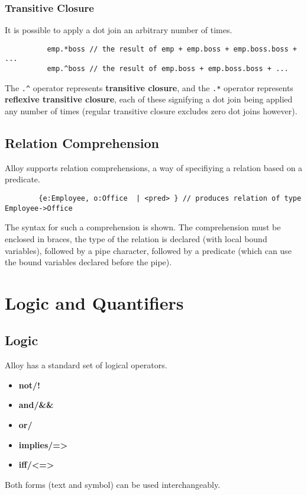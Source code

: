 \documentclass[10pt]{article}
\begin{document}
      \subsubsection*{Transitive Closure}
        It is possible to apply a dot join an arbitrary number of times.
        \begin{lstlisting}
          emp.*boss // the result of emp + emp.boss + emp.boss.boss + ...
          emp.^boss // the result of emp.boss + emp.boss.boss + ...
        \end{lstlisting}\par
        The \lstinline|.^| operator represents \textbf{transitive closure}, and the \lstinline|.*| operator represents \textbf{reflexive transitive closure}, each of these signifying a dot join being applied any number of times (regular transitive closure excludes zero dot joins however).
    \subsection*{Relation Comprehension}
      Alloy supports relation comprehensions, a way of specifiying a relation based on a predicate.
      \begin{lstlisting}
        {e:Employee, o:Office  | <pred> } // produces relation of type Employee->Office
      \end{lstlisting}\par
      The syntax for such a comprehension is shown. The comprehension must be enclosed in braces, the type of the relation is declared (with local bound variables), followed by a pipe character, followed by a predicate (which can use the bound variables declared before the pipe).

  \section*{Logic and Quantifiers}
    \subsection*{Logic}
      Alloy has a standard set of logical operators.
      \begin{itemize}
        \item\textbf{not/!}
        \item\textbf{and/\&\&}
        \item\textbf{or/\textbar\textbar}
        \item\textbf{implies/=\textgreater}
        \item\textbf{iff/\textless=\textgreater}
      \end{itemize}\par
      Both forms (text and symbol) can be used interchangeably.
\end{document}
